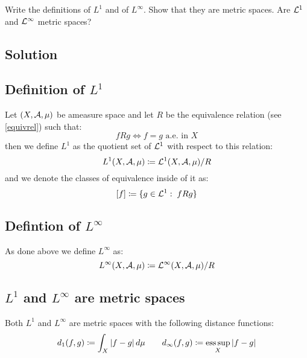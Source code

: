 
\question
Write the definitions of $L^1$ and of $L^\infty$. Show that they are metric spaces. Are $\mathcal{L}^1$ and $\mathcal{L}^\infty$ metric spaces?

\subsection*{Solution}

\subsection{Definition of \texorpdfstring{$L^1$}{L1}}
Let $(X,\mathcal{A},\mu)$ be ameasure space and let $R$ be the equivalence relation (see \ref{equivrel}) such that:
\[
    fRg \iff f=g \text{ a.e. in } X
\]
then we define $L^1$ as the quotient set of $\mathcal{L}^1$ with respect to this relation:
\[
    L^1 (X,\mathcal{A},\mu) \coloneqq \mathcal{L}^1(X,\mathcal{A},\mu) / R    
\]
and we denote the classes of equivalence inside of it as:
\[
    [f] \coloneqq \{ g\in\mathcal{L}^1 : \; fRg\}    
\]

\subsection{Defintion of \texorpdfstring{$L^\infty$}{Linf}}
As done above we define $L^\infty$ as:
\[
    L^\infty(X,\mathcal{A},\mu) \coloneqq \mathcal{L}^\infty(X,\mathcal{A},\mu)/R    
\]

\subsection{\texorpdfstring{$L^1$}{L1} and \texorpdfstring{$L^\infty$}{Linf} are metric spaces}
Both $L^1$ and $L^\infty$ are metric spaces with the following distance functions:
\[
    d_1(f,g) \coloneqq \int_X |f-g| \, d\mu \quad \quad d_\infty(f,g) \coloneqq \operatorname*{ess\,sup}_X |f-g| 
\]

